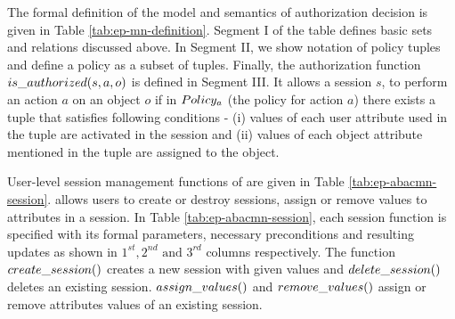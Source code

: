 	
	
	The formal definition of the model and semantics of authorization  decision is given in Table \ref{tab:ep-mn-definition}. Segment I of the table defines basic sets and relations discussed above. In Segment II, we show notation of policy tuples and define a policy as a subset of tuples. Finally, the authorization function $is\_authorized(s,a,o)$ is defined in Segment III.  It allows a session $s$, to perform an action $a$ on an object $o$ if in $Policy_a$ (the policy for action $a$)  there exists a tuple that satisfies following conditions - (i) values of each user attribute used in the tuple are activated in the session and (ii) values of each object attribute mentioned in the tuple are assigned to  the object.
	
	
	User-level session management functions of \EPMNModel{} are given in Table \ref{tab:ep-abacmn-session}. \EPMNModel{} allows users to create or destroy sessions, assign or remove values to attributes in a session.  In Table \ref{tab:ep-abacmn-session}, each session function is specified with its formal parameters, necessary preconditions and resulting updates as shown in $1^{st}, 2^{nd} \text{ and }  3^{rd}$ columns respectively. The function $create\_session()$ creates a new session with given values and $delete\_session()$ deletes an existing session.  $assign\_values()$ and $remove\_values()$  assign or remove attributes values of an existing session.
	
	